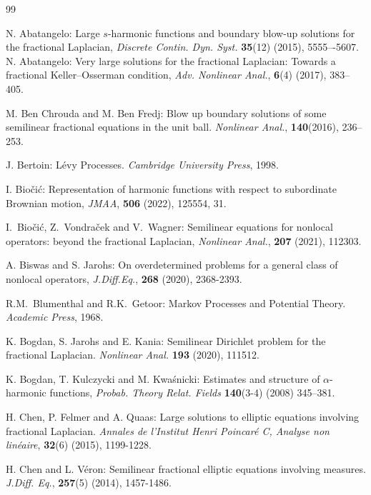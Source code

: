 \documentclass[a4paper,12pt,draft]{article}
\theoremstyle{plain}
\theoremstyle{definition}
\numberwithin{equation}{section}
\newcommand{\1}{1}
\begin{document}
\begin{thebibliography}{99}

 N. Abatangelo: Large $s$-harmonic functions and boundary blow-up solutions for the fractional Laplacian, \emph{Discrete Contin. Dyn. Syst.} \textbf{35}(12) (2015), 5555–-5607.
 N. Abatangelo: Very large solutions for the fractional Laplacian: Towards a fractional Keller–Osserman condition, \emph{Adv. Nonlinear Anal.}, \textbf{6}(4) (2017), 383--405. 

M. Ben Chrouda and M. Ben Fredj:
Blow up boundary solutions of some semilinear fractional equations in the unit ball.
\emph{Nonlinear Anal.}, \textbf{140}(2016), 236--253.

J. Bertoin: 
L\' evy Processes. \emph{Cambridge University Press}, 1998. 

 I. Bio\v{c}i\'{c}: Representation of harmonic functions with respect to subordinate {B}rownian motion, \emph{JMAA}, \textbf{506} (2022), 125554, 31.


 I.~Bio\v{c}i\'c, Z.~Vondra\v{c}ek and V.~Wagner:
Semilinear equations for nonlocal operators: beyond the fractional Laplacian, 
\emph{Nonlinear Anal.}, \textbf{207} (2021), 112303.  


 A. Biswas and S. Jarohs: On overdetermined problems for a general class of nonlocal operators, \emph{J.Diff.Eq.}, \textbf{268} (2020), 2368-2393.

   R.M.~Blumenthal and R.K.~Getoor:
    Markov Processes and Potential Theory. \emph{Academic Press}, 1968.

 K. Bogdan, S. Jarohs and E. Kania: Semilinear Dirichlet problem for the fractional Laplacian. \emph{Nonlinear Anal.} \textbf{193} (2020), 111512.

 K. Bogdan, T. Kulczycki and M. Kwa\' snicki: Estimates and structure of $\alpha$-harmonic functions, \emph{Probab. Theory Relat. Fields} \textbf{140}(3-4) (2008) 345–381.



 H. Chen, P. Felmer and A. Quaas:
Large solutions to elliptic equations involving fractional Laplacian.
\emph{Annales de l'Institut Henri Poincar\'{e} C, Analyse non lin\'{e}aire}, {\bf{32}}(6) (2015), 1199-1228.

H. Chen and  L. V\' eron:
Semilinear fractional elliptic equations involving measures.
\emph{J.Diff. Eq.}, \textbf{257}(5) (2014), 1457-1486.





\end{thebibliography}
\end{document}
